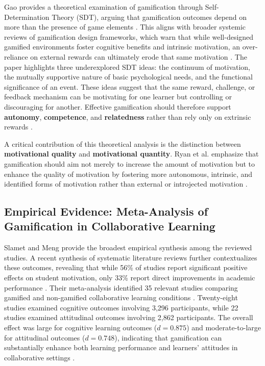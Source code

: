 \documentclass[12pt,a4paper]{article}
\begin{document}
Gao provides a theoretical examination of gamification through Self-Determination Theory (SDT), arguing that gamification outcomes depend on more than the presence of game elements \parencite{gao2024}. This aligns with broader systemic reviews of gamification design frameworks, which warn that while well-designed gamified environments foster cognitive benefits and intrinsic motivation, an over-reliance on external rewards can ultimately erode that same motivation \parencite{christopoulos2023gamification}. The paper highlights three underexplored SDT ideas: the continuum of motivation, the mutually supportive nature of basic psychological needs, and the functional significance of an event. These ideas suggest that the same reward, challenge, or feedback mechanism can be motivating for one learner but controlling or discouraging for another. Effective gamification should therefore support \textbf{autonomy}, \textbf{competence}, and \textbf{relatedness} rather than rely only on extrinsic rewards \parencite{gao2024}.

A critical contribution of this theoretical analysis is the distinction between \textbf{motivational quality} and \textbf{motivational quantity}. Ryan et al. emphasize that gamification should aim not merely to increase the amount of motivation but to enhance the quality of motivation by fostering more autonomous, intrinsic, and identified forms of motivation rather than external or introjected motivation \parencite{ryan2025}.


\subsection{Empirical Evidence: Meta-Analysis of Gamification in Collaborative Learning}

Slamet and Meng provide the broadest empirical synthesis among the reviewed studies. A recent synthesis of systematic literature reviews further contextualizes these outcomes, revealing that while 56\% of studies report significant positive effects on student motivation, only 33\% report direct improvements in academic performance \parencite{jaramillo2024impact}. Their meta-analysis identified 35 relevant studies comparing gamified and non-gamified collaborative learning conditions \parencite{slamet2025}. Twenty-eight studies examined cognitive outcomes involving 3,296 participants, while 22 studies examined attitudinal outcomes involving 2,862 participants. The overall effect was large for cognitive learning outcomes ($d=0.875$) and moderate-to-large for attitudinal outcomes ($d=0.748$), indicating that gamification can substantially enhance both learning performance and learners' attitudes in collaborative settings \parencite{slamet2025}.
\end{document}

